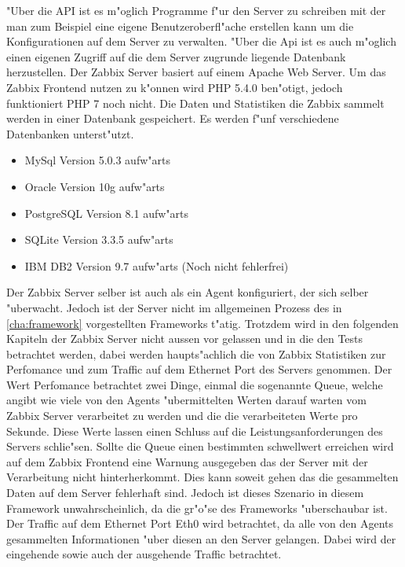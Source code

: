 "Uber die API ist es m"oglich Programme f"ur den Server zu schreiben mit der man zum Beispiel %
eine eigene Benutzeroberfl"ache erstellen kann um die Konfigurationen auf dem Server zu verwalten. %
"Uber die Api ist es auch m"oglich einen eigenen Zugriff auf die dem Server zugrunde liegende %
Datenbank herzustellen. %
Der Zabbix Server basiert auf einem Apache Web Server. Um das Zabbix Frontend nutzen zu k"onnen wird %
PHP 5.4.0 ben"otigt, jedoch funktioniert PHP 7 noch nicht. Die Daten und Statistiken die Zabbix sammelt %
werden in einer Datenbank gespeichert. Es werden f"unf verschiedene Datenbanken unterst"utzt. %
\begin{itemize}
\item MySql Version 5.0.3 aufw"arts
\item Oracle Version 10g aufw"arts
\item PostgreSQL Version 8.1 aufw"arts
\item SQLite Version 3.3.5 aufw"arts
\item IBM DB2 Version 9.7 aufw"arts (Noch nicht fehlerfrei)
\end{itemize}
\autocite{zabbix:req}
Der Zabbix Server selber ist auch als ein Agent konfiguriert, der sich selber "uberwacht. Jedoch ist der Server %
nicht im allgemeinen Prozess des in \cref{cha:framework} vorgestellten Frameworks t"atig. %
Trotzdem wird in den folgenden Kapiteln der Zabbix Server nicht aussen vor gelassen und in die %
den Tests betrachtet werden, dabei werden haupts"achlich die von Zabbix Statistiken zur Perfomance und zum %
Traffic auf dem Ethernet Port des Servers genommen. Der Wert Perfomance betrachtet zwei Dinge, einmal die sogenannte Queue, welche %
angibt wie viele von den Agents "ubermittelten Werten darauf warten vom Zabbix Server verarbeitet zu werden und die %
die verarbeiteten Werte pro Sekunde. Diese Werte lassen einen Schluss auf die Leistungsanforderungen des Servers schlie"sen. %
Sollte die Queue einen bestimmten schwellwert erreichen wird auf dem Zabbix Frontend eine Warnung ausgegeben das der %
Server mit der Verarbeitung nicht hinterherkommt. Dies kann soweit gehen das die gesammelten Daten auf dem Server fehlerhaft %
sind. Jedoch ist dieses Szenario in diesem Framework unwahrscheinlich, da die gr"o"se des %
Frameworks "uberschaubar ist. Der Traffic auf dem Ethernet Port Eth0 wird betrachtet, da alle von den Agents gesammelten Informationen %
"uber diesen an den Server gelangen. Dabei wird der eingehende sowie auch der ausgehende Traffic betrachtet.

